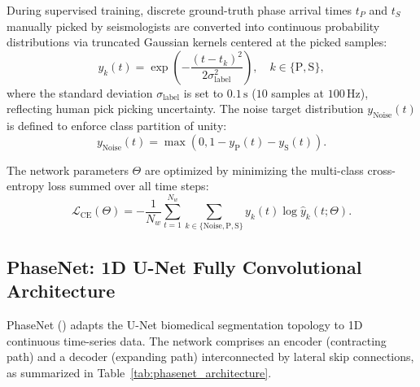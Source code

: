 During supervised training, discrete ground-truth phase arrival times $t_P$ and $t_S$ manually picked by seismologists are converted into continuous probability distributions via truncated Gaussian kernels centered at the picked samples:
\begin{equation}
  y_k(t) = \exp\left( - \frac{(t - t_k)^2}{2 \sigma_{\mathrm{label}}^2} \right), \quad k \in \{\mathrm{P}, \mathrm{S}\},
\end{equation}
where the standard deviation $\sigma_{\mathrm{label}}$ is set to $0.1\,\mathrm{s}$ ($10$ samples at $100\,\mathrm{Hz}$), reflecting human pick picking uncertainty. The noise target distribution $y_{\mathrm{Noise}}(t)$ is defined to enforce class partition of unity:
\begin{equation}
  y_{\mathrm{Noise}}(t) = \max\left(0, 1 - y_{\mathrm{P}}(t) - y_{\mathrm{S}}(t)\right).
\end{equation}

The network parameters $\Theta$ are optimized by minimizing the multi-class cross-entropy loss summed over all time steps:
\begin{equation}
  \mathcal{L}_{\mathrm{CE}}(\Theta) = - \frac{1}{N_w} \sum_{t=1}^{N_w} \sum_{k \in \{\mathrm{Noise}, \mathrm{P}, \mathrm{S}\}} y_k(t) \log \hat{y}_k(t; \Theta).
\end{equation}

\subsection{PhaseNet: 1D U-Net Fully Convolutional Architecture}
PhaseNet (\cite{PhaseNet}) adapts the U-Net biomedical segmentation topology to 1D continuous time-series data. The network comprises an encoder (contracting path) and a decoder (expanding path) interconnected by lateral skip connections, as summarized in Table~\ref{tab:phasenet_architecture}.

